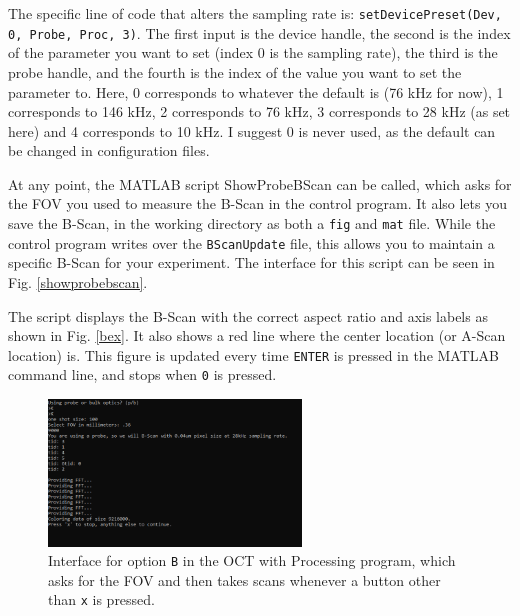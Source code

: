 \documentclass{article}
\begin{document}
\par{The specific line of code that alters the sampling rate is: \texttt{setDevicePreset(Dev, 0, Probe, Proc, 3)}. The first input is the device handle, the second is the index of the parameter you want to set (index 0 is the sampling rate), the third is the probe handle, and the fourth is the index of the value you want to set the parameter to. Here, 0 corresponds to whatever the default is (76 kHz for now), 1 corresponds to 146 kHz, 2 corresponds to 76 kHz, 3 corresponds to 28 kHz (as set here) and 4 corresponds to 10 kHz. I suggest 0 is never used, as the default can be changed in configuration files.}

\par{At any point, the MATLAB script ShowProbeBScan can be called, which asks for the FOV you used to measure the B-Scan in the control program. It also lets you save the B-Scan, in the working directory as both a \texttt{fig} and \texttt{mat} file. While the control program writes over the \texttt{BScanUpdate} file, this allows you to maintain a specific B-Scan for your experiment. The interface for this script can be seen in Fig. \ref{showprobebscan}.}

\par{The script displays the B-Scan with the correct aspect ratio and axis labels as shown in Fig. \ref{bex}. It also shows a red line where the center location (or A-Scan location) is. This figure is updated every time \texttt{ENTER} is pressed in the MATLAB command line, and stops when \texttt{0} is pressed.}

\begin{figure}[!h]
	\centering
	\includegraphics[width=0.6\textwidth]{Data for Probe Writeup/BMode Probe.png}
	\caption{Interface for option \texttt{B} in the OCT with Processing program, which asks for the FOV and then takes scans whenever a button other than \texttt{x} is pressed.}\label{optionb}
\end{figure}
\end{document}
